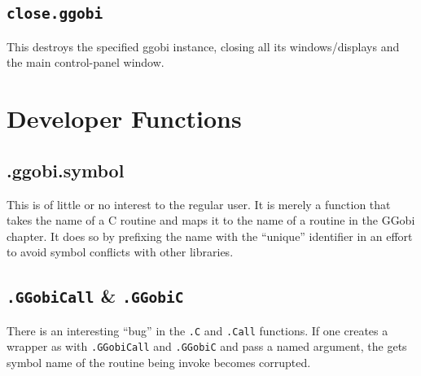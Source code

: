 \documentclass{article}
\def\SFunction#1{{\texttt{\red #1}}}
\begin{document}
\subsection{\SFunction{close.ggobi}}
This destroys the specified ggobi instance, closing all its
windows/displays and the main control-panel window.


\section{Developer Functions}

\subsection{.ggobi.symbol}
This is of little or no interest to the regular user.  It is merely a
function that takes the name of a C routine and maps it to the name of
a routine in the GGobi chapter.  It does so by prefixing the name with
the ``unique'' identifier  in an effort to avoid
symbol conflicts with other libraries.

\subsection{\SFunction{.GGobiCall} \& \SFunction{.GGobiC}}

There is an interesting ``bug'' in the \SFunction{.C} and
\SFunction{.Call} functions. If one creates a wrapper as with
\SFunction{.GGobiCall} and \SFunction{.GGobiC} and pass a named
argument, the gets symbol name of the routine being invoke becomes
corrupted.
\end{document}
